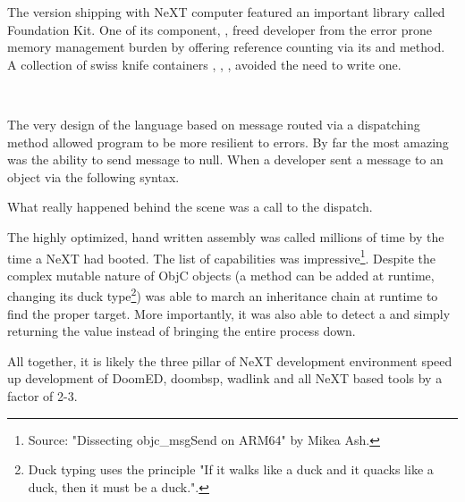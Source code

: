 \par
The version shipping with NeXT computer featured an important library called Foundation Kit. One of its component, , freed developer from the error prone memory management burden by offering reference counting via its  and  method. A collection of swiss knife containers , , ,  avoided the need to write one.\\
\par
{}\\
\par
The very design of the language based on message routed via a dispatching method  allowed program to be more resilient to errors. By far the most amazing was the ability to send message to null. When a developer sent a message to an object via the following syntax.\\ \par
{}
What really happened behind the scene was a call to the dispatch.\\
\par
{}
The highly optimized, hand written assembly was called millions of time by the time a NeXT had booted. The list of capabilities was impressive\footnote{Source: "Dissecting objc\_msgSend on ARM64" by Mikea Ash.}. Despite the complex mutable nature of ObjC objects (a method can be added at runtime, changing its duck type\footnote{Duck typing uses the principle "If it walks like a duck and it quacks like a duck, then it must be a duck.".})  was able to march an inheritance chain at runtime to find the proper target. More importantly, it was also able to detect a  and simply returning the value  instead of bringing the entire process down.\\
\par

All together, it is likely the three pillar of NeXT development environment speed up development of DoomED, doombsp, wadlink and all NeXT based tools by a factor of 2-3. \

